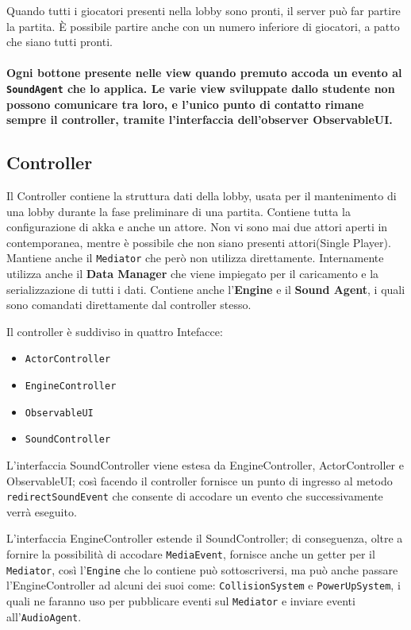         Quando tutti i giocatori presenti nella lobby sono pronti, il server può far partire la partita. È possibile partire anche con un numero inferiore di giocatori, a patto che siano tutti pronti.
        
    \paragraph{Ogni bottone presente nelle view quando premuto accoda un evento al \texttt{SoundAgent} che lo applica.
    Le varie view sviluppate dallo studente non possono comunicare tra loro, e l'unico punto di contatto rimane sempre il controller, tramite l'interfaccia dell'observer ObservableUI.}

    \subsection{Controller}
        Il Controller contiene la struttura dati della lobby, usata per il mantenimento di una lobby durante la fase
        preliminare di una partita.
        Contiene tutta la configurazione di akka e anche un attore.
        Non vi sono mai due attori aperti in contemporanea, 
        mentre è possibile che non siano presenti attori(Single Player).
        Mantiene anche il \texttt{Mediator} che però non utilizza direttamente.
        Internamente utilizza anche il \textbf{Data Manager} che viene impiegato per il caricamento e la serializzazione di tutti i dati.
        Contiene anche l'\textbf{Engine} e il \textbf{Sound Agent}, i quali sono comandati direttamente dal controller stesso.
        
        Il controller è suddiviso in quattro Intefacce:
        \begin{itemize}
	        \item \texttt{ActorController}
	        \item \texttt{EngineController}
	        \item \texttt{ObservableUI}
        	\item \texttt{SoundController}
        \end{itemize}
        
        L'interfaccia SoundController viene estesa da EngineController, ActorController e ObservableUI; così facendo il controller fornisce un punto di ingresso al metodo \texttt{redirectSoundEvent} che consente di accodare un evento che successivamente verrà eseguito.
        
        L'interfaccia EngineController estende il SoundController; di conseguenza, oltre a fornire la possibilità di accodare \texttt{MediaEvent}, fornisce anche un getter per il \texttt{Mediator}, così l'\texttt{Engine} che lo contiene può sottoscriversi, ma può anche passare l'EngineController ad alcuni dei suoi come:
        \texttt{CollisionSystem} e \texttt{PowerUpSystem}, i quali ne faranno uso per pubblicare eventi sul \texttt{Mediator} e inviare eventi all'\texttt{AudioAgent}.
        
